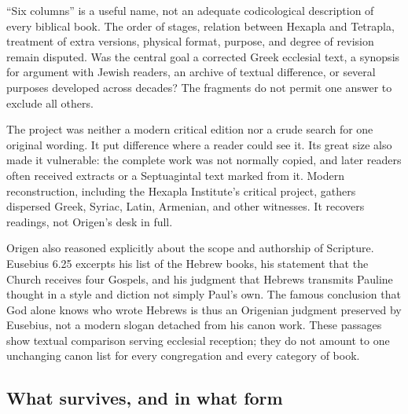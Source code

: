 ``Six columns'' is a useful name, not an adequate codicological description of
every biblical book. The order of stages, relation between Hexapla and
Tetrapla, treatment of extra versions, physical format, purpose, and degree of
revision remain disputed. Was the central goal a corrected Greek ecclesial
text, a synopsis for argument with Jewish readers, an archive of textual
difference, or several purposes developed across decades? The fragments do not
permit one answer to exclude all others.

The project was neither a modern critical edition nor a crude search for one
original wording. It put difference where a reader could see it. Its great
size also made it vulnerable: the complete work was not normally copied, and
later readers often received extracts or a Septuagintal text marked from it.
Modern reconstruction, including the Hexapla Institute's critical project,
gathers dispersed Greek, Syriac, Latin, Armenian, and other witnesses. It
recovers readings, not Origen's desk in full.

Origen also reasoned explicitly about the scope and authorship of Scripture.
Eusebius 6.25 excerpts his list of the Hebrew books, his statement that the
Church receives four Gospels, and his judgment that Hebrews transmits Pauline
thought in a style and diction not simply Paul's own. The famous conclusion
that God alone knows who wrote Hebrews is thus an Origenian judgment preserved
by Eusebius, not a modern slogan detached from his canon work. These passages
show textual comparison serving ecclesial reception; they do not amount to one
unchanging canon list for every congregation and every category of book.

\subsection{What survives, and in what form}

